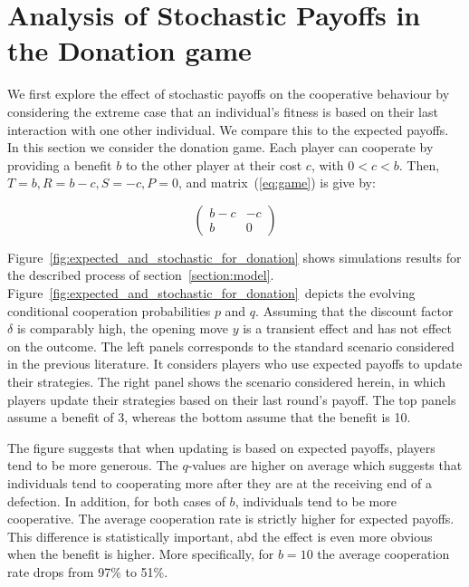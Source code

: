 \documentclass[11pt]{article}
\theoremstyle{plainCl1}
\theoremstyle{plainCl2}
\begin{document}
\section{Analysis of Stochastic Payoffs in the Donation game}\label{section:donation}

We first explore the effect of stochastic payoffs on the cooperative behaviour
by considering the extreme case that an individual's fitness is based on their
last interaction with one other individual. We compare this to the expected
payoffs. In this section we consider the donation game.
Each player can cooperate by providing a benefit \(b\) to the other
player at their cost \(c\), with \(0 < c < b\). Then, \(T=b, R=b-c, S=-c, P=0\),
and matrix~(\ref{eq:game}) is give by:

\begin{equation}\label{eq:donation_normal_form}
    \begin{pmatrix}
        b-c & -c  \\
        b & 0
    \end{pmatrix}
\end{equation}

Figure~\ref{fig:expected_and_stochastic_for_donation} shows simulations results
for the described process of section~\ref{section:model}.
Figure~\ref{fig:expected_and_stochastic_for_donation}~depicts the evolving
conditional cooperation probabilities $p$ and $q$. Assuming that the discount
factor~$\delta$ is comparably high, the opening move \(y\) is a transient effect
and has not effect on the outcome.
The left panels corresponds to the standard scenario considered in the previous
literature. It considers players who use expected payoffs to update their
strategies. The right panel shows the scenario considered herein, in which
players update their strategies based on their last round's payoff. The top
panels assume a benefit of 3, whereas the bottom assume that the benefit is 10.

The figure suggests that when updating is based on expected payoffs, players
tend to be more generous. The $q$-values are higher on average which suggests
that individuals tend to cooperating more after they are at the receiving end
of a defection. In addition, for both cases of \(b\), individuals tend to
be more cooperative. The average cooperation rate is strictly higher for expected
payoffs. This difference is statistically important, abd the effect is even more
obvious when the benefit is higher. More specifically, for \(b=10\) the average
cooperation rate drops from 97\% to 51\%.
\end{document}
